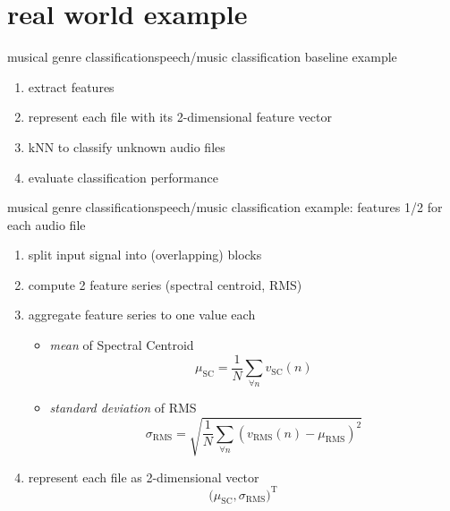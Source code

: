     \section[example]{real world example}
        \begin{frame}{musical genre classification}{speech/music classification baseline example}
            \begin{enumerate}
                \item	extract features
                \smallskip
                \item   represent each file with its 2-dimensional feature vector
                \smallskip
                \item   kNN to classify unknown audio files
                \smallskip
                \item   evaluate classification performance
            \end{enumerate}
        \end{frame}

        \begin{frame}{musical genre classification}{speech/music classification example: features 1/2}
            for each audio file
            \begin{enumerate}
                \item	split input signal into (overlapping) blocks
                \item	compute 2 feature series (spectral centroid, RMS)
                \item<2->	aggregate feature series to one value each
                    \begin{itemize}
                        \item	\textit{mean} of Spectral Centroid
                            \begin{equation*}
                                \mu_\mathrm{SC} = \frac{1}{N}\sum_{\forall n}{v_\mathrm{SC}(n)}
                            \end{equation*}
                        \item	\textit{standard deviation} of RMS
                            \begin{equation*}
                                \sigma_\mathrm{RMS} = \sqrt{\frac{1}{N}\sum_{\forall n}{(v_\mathrm{RMS}(n)-\mu_\mathrm{RMS})^2}}
                            \end{equation*}
                    \end{itemize}
                \item<3->	represent each file as 2-dimensional vector
                    \begin{equation*}
                        \big(\mu_\mathrm{SC}, \sigma_\mathrm{RMS}\big)^\mathrm{T}
                    \end{equation*}
            \end{enumerate}				
        \end{frame}


